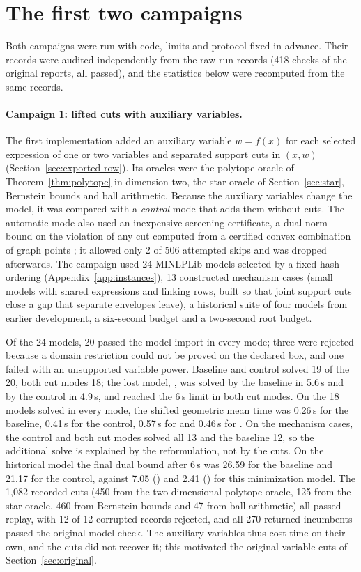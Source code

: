 \section{The first two campaigns}\label{app:campaigns12}

Both campaigns were run with code, limits and protocol fixed in advance. Their
records were audited independently from the raw run records (418 checks of the
original reports, all passed), and the statistics below were recomputed from
the same records.

\paragraph{Campaign 1: lifted cuts with auxiliary variables.}
The first implementation added an auxiliary variable $w=f(x)$ for each
selected expression of one or two variables and separated support cuts in
$(x,w)$ (Section~\ref{sec:exported-row}). Its oracles were the polytope oracle
of Theorem~\ref{thm:polytope} in dimension two, the star oracle of
Section~\ref{sec:star}, Bernstein bounds and ball arithmetic. Because the
auxiliary variables change the model, it was compared with a \emph{control}
mode that adds them without cuts. The automatic mode also used an inexpensive
screening certificate, a dual-norm bound on the violation of any cut computed
from a certified convex combination of graph points \citep{Mangasarian1999};
it allowed only 2 of 506 attempted skips and was dropped afterwards. The
campaign used 24 MINLPLib models selected by a fixed hash ordering
(Appendix~\ref{app:instances}), 13 constructed mechanism cases (small models
with shared expressions and linking rows, built so that joint support cuts
close a gap that separate envelopes leave), a historical suite of four models
from earlier development, a six-second budget and a two-second root budget.

Of the 24 models, 20 passed the model import in every mode; three were rejected
because a domain restriction could not be proved on the declared box, and one
failed with an unsupported variable power. Baseline and control solved 19 of
the 20, both cut modes 18; the lost model, , was solved by
the baseline in 5.6\,s and by the control in 4.9\,s, and reached the 6\,s limit in
both cut modes. On the 18 models solved in every mode, the shifted geometric
mean time was 0.26\,s for the baseline, 0.41\,s for the control, 0.57\,s for
 and 0.46\,s for . On the mechanism cases, the control and
both cut modes solved all 13 and the baseline 12, so the additional solve is
explained by the reformulation, not by the cuts. On the historical model
 the final dual bound after 6\,s was 26.59 for the baseline and 21.17 for the
control, against 7.05 () and 2.41 () for this
minimization model. The
1{,}082 recorded cuts (450 from the two-dimensional polytope oracle, 125 from the
star oracle, 460 from Bernstein bounds and 47 from ball arithmetic) all passed
replay, with 12 of 12 corrupted records rejected, and all 270 returned
incumbents passed the original-model check. The auxiliary variables thus cost
time on their own, and the cuts did not recover it; this motivated the
original-variable cuts of Section~\ref{sec:original}.

